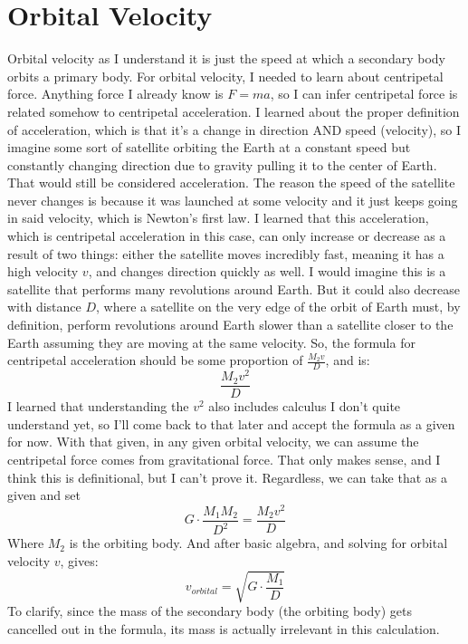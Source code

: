 \documentclass[12pt]{article}
\begin{document}
\section{Orbital Velocity}
Orbital velocity as I understand it is just the speed at which a secondary body orbits a primary body. For orbital velocity, 
I needed to learn about centripetal force. Anything force I already know is $F = ma$, so I can infer centripetal force is related somehow
to centripetal acceleration. I learned about the proper definition of acceleration, which is that it's a change in direction AND speed (velocity), so I imagine some sort 
of satellite orbiting the Earth at a constant speed but constantly changing direction due to gravity pulling it to the center of Earth. That would still be 
considered acceleration. The reason the speed of the satellite never changes is because it was launched at some velocity and it just keeps going in said velocity, which 
is Newton's first law. I learned that this acceleration, which is centripetal acceleration in this case, can only increase or decrease as a result of two things: 
either the satellite moves incredibly fast, meaning it has a high velocity $v$, and changes direction quickly as well. I would imagine this is a 
satellite that performs many revolutions around Earth. But it could also decrease with distance $D$, where a satellite on the very edge of the orbit of Earth must,
by definition, perform revolutions around Earth slower than a satellite closer to the Earth assuming they are moving at the same velocity. So, the formula for centripetal 
acceleration should be some proportion of $\frac{M_2v}{D}$, and is: $$\frac{M_2v^2}{D}$$
I learned that understanding the $v^2$ also includes calculus I don't quite understand yet, so I'll come back to that later and accept the formula as a given for now.
With that given, in any given orbital velocity, we can assume the centripetal force comes from gravitational force. That only makes sense, and I think this is 
definitional, but I can't prove it. Regardless, we can take that as a given and set
$$G \cdot \frac{M_1 M_2}{D^2} = \frac{M_2v^2}{D}$$ 
Where $M_2$ is the orbiting body. And after basic algebra, and solving for orbital velocity $v$, gives:
$$v_{orbital} = \sqrt{G \cdot \frac{M_1}{D}}$$
To clarify, since the mass of the secondary body (the orbiting body) gets cancelled out in the formula, its mass is actually irrelevant in this calculation.
\end{document}
